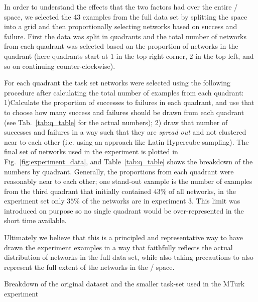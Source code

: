 In order to understand the effects that the two \famsec{} factors had over the entire \xQ{}/\xO{} space, we selected the 43 examples from the full data set by splitting the space into a grid and then proportionally selecting networks based on success and failure. First the data was split in quadrants and the total number of networks from each quadrant was selected based on the proportion of networks in the quadrant (here quadrants start at $1$ in the top right corner, $2$ in the top left, and so on continuing counter-clockwise).

For each quadrant the task set networks were selected using the following procedure after calculating the total number of examples from each quadrant: 1)Calculate the proportion of successes to failures in each quadrant, and use that to choose how many success and failures should be drawn from each quadrant (see Tab.~\ref{tab:q_table} for the actual numbers); 2) draw that number of successes and failures in a way such that they are \emph{spread out} and not clustered near to each other (i.e. using an approach like Latin Hypercube sampling). The final set of networks used in the experiment is plotted in Fig.~\ref{fig:experiment_data}, and Table~\ref{tab:q_table} shows the breakdown of the numbers by quadrant. Generally, the proportions from each quadrant were reasonably near to each other; one stand-out example is the number of examples from the third quadrant that initially contained $43\%$ of all networks, in the experiment set only $35\%$ of the networks are in experiment 3. This limit was introduced on purpose so no single quadrant would be over-represented in the short time available.

Ultimately we believe that this is a principled and representative way to have drawn the experiment examples in a way that faithfully reflects the actual distribution of networks in the full data set, while also taking precautions to also represent the full extent of the networks in the \xQ/\xO{} space.


\begin{table}
    \centering
    \caption{Breakdown of the original dataset and the smaller task-set used in the MTurk experiment}
    \label{tab:q_table}
    
\end{table}
